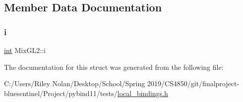 \subsection{Member Data Documentation}
\mbox{\label{struct_mix_g_l2_aec3b0192e729604a75fe94a5f2d71989}} 
\subsubsection{\texorpdfstring{i}{i}}
{\footnotesize\ttfamily \mbox{\hyperlink{warnings_8h_a74f207b5aa4ba51c3a2ad59b219a423b}{int}} Mix\+G\+L2\+::i}



The documentation for this struct was generated from the following file\+:\begin{DoxyCompactItemize}
\item 
C\+:/\+Users/\+Riley Nolan/\+Desktop/\+School/\+Spring 2019/\+C\+S4850/git/finalproject-\/bluesentinel/\+Project/pybind11/tests/\mbox{\hyperlink{local__bindings_8h}{local\+\_\+bindings.\+h}}\end{DoxyCompactItemize}
